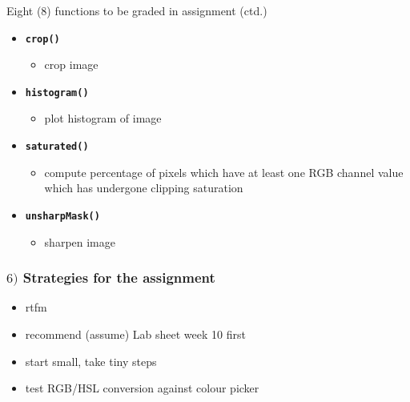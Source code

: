 \documentclass[english,14pt]{beamer}
\newcommand\red[1]{{\color{red} #1}}
\begin{document}
\begin{frame}[fragile]

\frametitle{}

Eight (8) functions to be graded in assignment (ctd.)

\vspace*{5mm}

\begin{itemize}
	\item \textbf{\red{\texttt{crop()}}}
	\begin{itemize}
		\item crop image
	\end{itemize}
		
	\item \textbf{\red{\texttt{histogram()}}}
	\begin{itemize}
		\item plot histogram of image
	\end{itemize}
			
	\item \textbf{\red{\texttt{saturated()}}}
	\begin{itemize}
		\item compute percentage of pixels which have at least one RGB channel value which has undergone clipping saturation
	\end{itemize}
			
	\item \textbf{\red{\texttt{unsharpMask()}}}
	\begin{itemize}
		\item sharpen image
	\end{itemize}
\end{itemize}

\end{frame}


\begin{frame}[fragile]

\frametitle{$6)$ Strategies for the assignment}

\begin{itemize}
	\item rtfm
	\item recommend (assume) Lab sheet week 10 first
	\item start small, take tiny steps
	\item test RGB/HSL conversion against colour picker
\end{itemize}

\end{frame}
\end{document}
